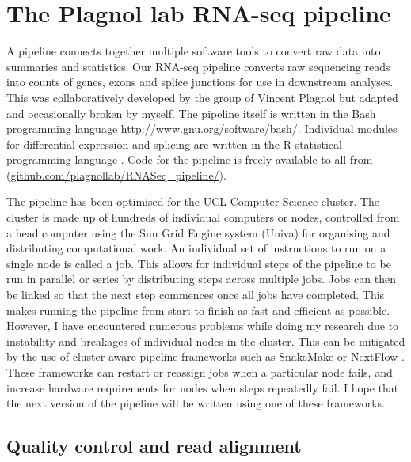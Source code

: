 \section{The Plagnol lab RNA-seq pipeline}

A pipeline connects together multiple software tools to convert raw data into summaries and statistics.
Our RNA-seq pipeline converts raw sequencing reads into counts of genes, exons and splice junctions for use in downstream analyses.
This was collaboratively developed by the group of Vincent Plagnol but adapted and occasionally broken by myself.
The pipeline itself is written in the Bash programming language \url{http://www.gnu.org/software/bash/}. 
Individual modules for differential expression and splicing are written in the R statistical programming language \citep{Gentleman1996}. 
Code for the pipeline is freely available to all from (\url{github.com/plagnollab/RNASeq_pipeline/}).

The pipeline has been optimised for the UCL Computer Science cluster.
The cluster is made up of hundreds of individual computers or nodes, controlled from a head computer using the Sun Grid Engine system (Univa) for organising and distributing computational work. 
An individual set of instructions to run on a single node is called a job.
This allows for individual steps of the pipeline to be run in parallel or series by distributing steps across multiple jobs.
Jobs can then be linked so that the next step commences once all jobs have completed.
This makes running the pipeline from start to finish as fast and efficient as possible.
However, I have encountered numerous problems while doing my research due to instability and breakages of individual nodes in the cluster.
This can be mitigated by the use of cluster-aware pipeline frameworks such as SnakeMake or NextFlow \citep{Koster2012,DiTommaso2017}. 
These frameworks can restart or reassign jobs when a particular node fails, and increase hardware requirements for nodes when steps repeatedly fail.
I hope that the next version of the pipeline will be written using one of these frameworks.


\subsection{Quality control and read alignment}


